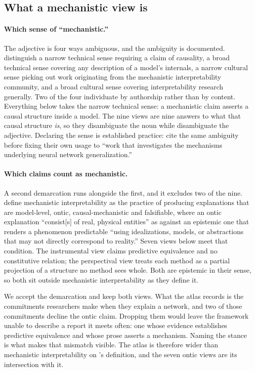 \documentclass{article}
\begin{document}
\subsection{What a mechanistic view is}

\paragraph{Which sense of ``mechanistic.''}
The adjective is four ways ambiguous, and the ambiguity is documented.
\citet{saphra2024} distinguish a narrow technical sense requiring a claim
of causality, a broad technical sense covering any description of a
model's internals, a narrow cultural sense picking out work originating
from the mechanistic interpretability community, and a broad cultural
sense covering interpretability research generally.  Two of the four
individuate by authorship rather than by content.  Everything below takes
the narrow technical sense: a mechanistic claim asserts a causal
structure inside a model.  The nine views are nine answers to what that
causal structure \emph{is}, so they disambiguate the noun while
\citeauthor{saphra2024} disambiguate the adjective.  Declaring the sense is
established practice: \citet{sharkey2025} cite the same ambiguity before
fixing their own usage to ``work that investigates the mechanisms
underlying neural network generalization.''

\paragraph{Which claims count as mechanistic.}
A second demarcation runs alongside the first, and it excludes two of the
nine.  \citet{ayonrinde2025} define mechanistic interpretability as the
practice of producing explanations that are model-level, ontic,
causal-mechanistic and falsifiable, where an ontic explanation
``consist[s] of real, physical entities'' as against an epistemic one that
renders a phenomenon predictable ``using idealizations, models, or
abstractions that may not directly correspond to reality.''  Seven views
below meet that condition.  The instrumental view claims predictive
equivalence and no constitutive relation; the perspectival view treats
each method as a partial projection of a structure no method sees whole.
Both are epistemic in their sense, so both sit outside mechanistic
interpretability as they define it.

We accept the demarcation and keep both views.  What the atlas records is
the commitments researchers make when they explain a network, and two of
those commitments decline the ontic claim.  Dropping them would leave the
framework unable to describe a report it meets often: one whose evidence
establishes predictive equivalence and whose prose asserts a mechanism.
Naming the stance is what makes that mismatch visible.  The atlas is
therefore wider than mechanistic interpretability on
\citeauthor{ayonrinde2025}'s definition, and the seven ontic views are its
intersection with it.
\end{document}
